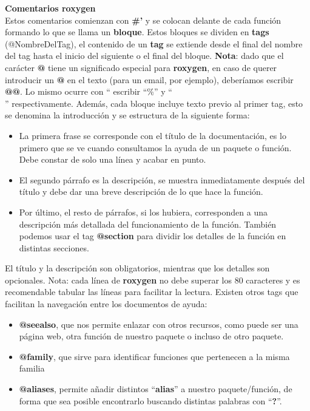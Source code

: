 \textbf{Comentarios roxygen} \\
Estos comentarios comienzan con \textbf{\#'} y se colocan delante de cada funci\'on formando lo que
se llama un \textbf{bloque}. Estos bloques se dividen en \textbf{tags} (@NombreDelTag), el contenido de un
\textbf{tag} se extiende desde el final del nombre del tag hasta el inicio del siguiente o el final del
bloque.
\textbf{Nota}: dado que el car\'acter \textbf{@} tiene un significado especial para \textbf{roxygen}, en caso de querer
introducir un \textbf{@} en el texto (para un email, por ejemplo), deber\'iamos escribir \textbf{@@}. Lo mismo
ocurre con “%
escribir “\%” y “\\” respectivamente.
Adem\'as, cada bloque incluye texto previo al primer tag, esto se denomina la introducci\'on y
se estructura de la siguiente forma:

\begin{itemize}
    \item La primera frase se corresponde con el t\'itulo de la documentaci\'on, es lo primero que
se ve cuando consultamos la ayuda de un paquete o funci\'on. Debe constar de solo
una l\'inea y acabar en punto.
    \item El segundo p\'arrafo es la descripci\'on, se muestra inmediatamente despu\'es del t\'itulo y
debe dar una breve descripci\'on de lo que hace la funci\'on.
    \item Por \'ultimo, el resto de p\'arrafos, si los hubiera, corresponden a una descripci\'on m\'as
detallada del funcionamiento de la funci\'on. Tambi\'en podemos usar el tag \textbf{@section}
para dividir los detalles de la funci\'on en distintas secciones.
\end{itemize}

El t\'itulo y la descripci\'on son obligatorios, mientras que los detalles son opcionales.
Nota: cada l\'inea de \textbf{roxygen} no debe superar los 80 caracteres y es recomendable tabular
las l\'ineas para facilitar la lectura.
Existen otros tags que facilitan la navegaci\'on entre los documentos de ayuda:

\begin{itemize}
    \item \textbf{@seealso}, que nos permite enlazar con otros recursos, como puede ser una p\'agina
web, otra funci\'on de nuestro paquete o incluso de otro paquete.
    \item \textbf{@family}, que sirve para identificar funciones que pertenecen a la misma familia
    \item \textbf{@aliases}, permite a\~nadir distintos “\textbf{alias}” a nuestro paquete/funci\'on, de forma que
sea posible encontrarlo buscando distintas palabras con “\textbf{?}”.
\end{itemize}

